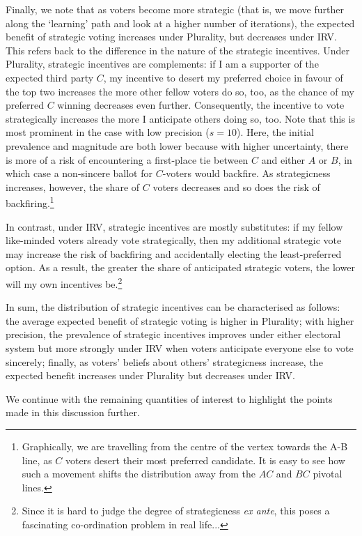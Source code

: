 \documentclass[12pt, letter]{article}
\begin{document}
Finally, we note that as voters become more strategic (that is, we move further along the `learning' path and look at a higher number of iterations), the expected benefit of strategic voting increases under Plurality, but decreases under IRV. This refers back to the difference in the nature of the strategic incentives. Under Plurality, strategic incentives are complements: if I am a supporter of the expected third party $C$, my incentive to desert my preferred choice in favour of the top two increases the more other fellow voters do so, too, as the chance of my preferred $C$ winning decreases even further. Consequently, the incentive to vote strategically increases the more I anticipate others doing so, too. Note that this is most prominent in the case with low precision ($s = 10$). Here, the initial prevalence and magnitude are both lower because with higher uncertainty, there is more of a risk of encountering a first-place tie between $C$ and either $A$ or $B$, in which case a non-sincere ballot for $C$-voters would backfire. As strategicness increases, however, the share of $C$ voters decreases and so does the risk of backfiring.\footnote{Graphically, we are travelling from the centre of the vertex towards the A-B line, as $C$ voters desert their most preferred candidate. It is easy to see how such a movement shifts the distribution away from the $AC$ and $BC$ pivotal lines.}

In contrast, under IRV, strategic incentives are mostly substitutes: if my fellow like-minded voters already vote strategically, then my additional strategic vote may increase the risk of backfiring and accidentally electing the least-preferred option. As a result, the greater the share of anticipated strategic voters, the lower will my own incentives be.\footnote{Since it is hard to judge the degree of strategicness \emph{ex ante}, this poses a fascinating co-ordination problem in real life...}

In sum, the distribution of strategic incentives can be characterised as follows: the average expected benefit of strategic voting is higher in Plurality; with higher precision, the prevalence of strategic incentives improves under either electoral system but more strongly under IRV when voters anticipate everyone else to vote sincerely; finally, as voters' beliefs about others' strategicness increase, the expected benefit increases under Plurality but decreases under IRV.

We continue with the remaining quantities of interest to highlight the points made in this discussion further.
\end{document}
